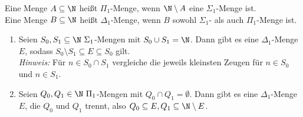 
\begin{exercise}[225]

Eine Menge $A \subseteq \N$ heißt $\Pi_1$-Menge, wenn $\N \setminus A$ eine
$\Sigma_1$-Menge ist. \\
Eine Menge $B \subseteq \N$ heißt $\Delta_1$-Menge, wenn $B$ sowohl $\Sigma_1$-
als auch $\Pi_1$-Menge ist. \\
\begin{enumerate}[label = \alph*.]
	\item Seien $S_0,S_1 \subseteq \N\ \Sigma_1$-Mengen mit $S_0 \cup S_1 = \N$.
	Dann gibt es eine $\Delta_1$-Menge $E$, sodass $S_0 \setminus S_1 \subseteq E \subseteq S_0$
	gilt. \\
	\textit{Hinweis:} Für $n \in S_0 \cap S_1$ vergleiche die jeweils kleinsten
	Zeugen für $n \in S_0$ und $n \in S_1$.
	\item Seien $Q_0,Q_1 \in \N\ \Pi_1$-Mengen mit $Q_0 \cap Q_1 = \emptyset$.
	Dann gibt es eine $\Delta_1$-Menge $E$, die $Q_0$ und $Q_1$ trennt, also
	$Q_0 \subseteq E, Q_1 \subseteq \N \setminus E$.
\end{enumerate}

\end{exercise}


